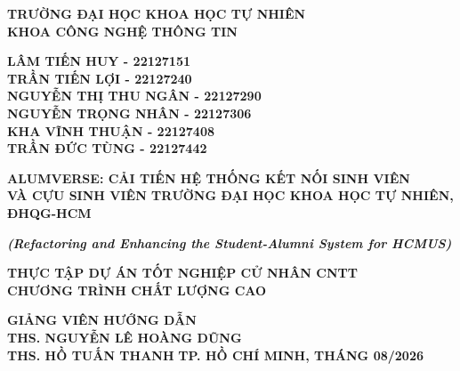 \documentclass[12pt,a4paper,oneside]{report}
\begin{document}
\newpage
\thispagestyle{empty}
\begin{center}
{\fontsize{12}{16}\selectfont \textbf{TRƯỜNG ĐẠI HỌC KHOA HỌC TỰ NHIÊN}}\\[2pt]
{\fontsize{12}{16}\selectfont \textbf{KHOA CÔNG NGHỆ THÔNG TIN}}

\par\vspace{1.5cm}
{\fontsize{12}{18}\selectfont \textbf{LÂM TIẾN HUY - 22127151}}\\[3pt]
{\fontsize{12}{18}\selectfont \textbf{TRẦN TIẾN LỢI - 22127240}}\\[3pt]
{\fontsize{12}{18}\selectfont \textbf{NGUYỄN THỊ THU NGÂN - 22127290}}\\[3pt]
{\fontsize{12}{18}\selectfont \textbf{NGUYỄN TRỌNG NHÂN - 22127306}}\\[3pt]
{\fontsize{12}{18}\selectfont \textbf{KHA VĨNH THUẬN - 22127408}}\\[3pt]
{\fontsize{12}{18}\selectfont \textbf{TRẦN ĐỨC TÙNG - 22127442}}

\par\vspace{2cm}
{\fontsize{15}{21.5}\selectfont\bfseries ALUMVERSE: CẢI TIẾN HỆ THỐNG KẾT NỐI SINH VIÊN\\[6pt]
VÀ CỰU SINH VIÊN TRƯỜNG ĐẠI HỌC KHOA HỌC TỰ NHIÊN, ĐHQG-HCM}

\par\vspace{0.4cm}
{\fontsize{12}{16}\selectfont\bfseries\itshape (Refactoring and Enhancing the Student-Alumni System for HCMUS)}

\par\vspace{1.5cm}
{\fontsize{12}{18}\selectfont\bfseries THỰC TẬP DỰ ÁN TỐT NGHIỆP CỬ NHÂN CNTT}\\[6pt]
{\fontsize{12}{18}\selectfont\bfseries CHƯƠNG TRÌNH CHẤT LƯỢNG CAO}

\par\vspace{1.5cm}
{\fontsize{12}{18}\selectfont
\textbf{GIẢNG VIÊN HƯỚNG DẪN}\\[4pt]
\textbf{THS. NGUYỄN LÊ HOÀNG DŨNG}\\[3pt]
\textbf{THS. HỒ TUẤN THANH}}
\vfill
{\fontsize{12}{18}\selectfont\bfseries TP. HỒ CHÍ MINH, THÁNG 08/2026}
\end{center}
\newpage
\end{document}

